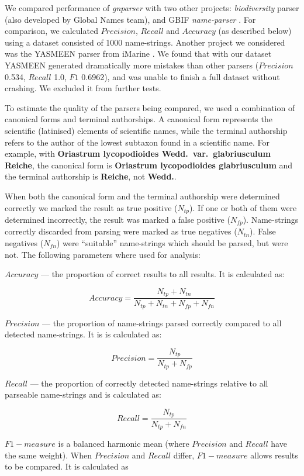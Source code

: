 \documentclass{bmcart}
\begin{document}
We compared performance of \textit{gnparser} with two other projects: \textit{biodiversity} parser \cite{Boyle2013, biodiversity} (also developed by Global Names team), and GBIF \textit{name-parser} \cite{gbifNameParser}. For comparison, we calculated $Precision$, $Recall$ and $Accuracy$ (as described below) using a dataset consisted of 1000 name-strings. Another project we considered was the YASMEEN parser from iMarine \cite{VandenBerghe2015}. We found that with our dataset YASMEEN generated dramatically more mistakes than other parsers ($Precision$ 0.534, $Recall$ 1.0, $F1$ 0.6962), and was unable to finish a full dataset without crashing. We excluded it from further tests.

To estimate the quality of the parsers being compared, we used a combination of canonical forms and terminal authorships. A canonical form represents the scientific (latinised) elements of scientific names, while the terminal authorship refers to the author of the lowest subtaxon found in a scientific name. For example, with \textbf{Oriastrum lycopodioides Wedd.\ var.\ glabriusculum Reiche}, the canonical form is \textbf{Oriastrum lycopodioides glabriusculum} and the terminal authorship is \textbf{Reiche}, not \textbf{Wedd.}.

When both the canonical form and the terminal authorship were determined correctly we marked the result as true positive ($N_{tp}$). If one or both of them were determined incorrectly, the result was marked a false positive ($N_{fp}$). Name-strings correctly discarded from parsing were marked as true negatives ($N_{tn}$). False negatives ($N_{fn}$) were ``suitable'' name-strings which should be parsed, but were not. The following parameters where used for analysis:

$Accuracy$ --- the proportion of correct results to all results. It is calculated as:

\[Accuracy = \dfrac{N_{tp} + N_{tn}}{N_{tp} + N_{tn} + N_{fp} + N_{fn}}\]

$Precision$ --- the proportion of name-strings parsed correctly compared to all detected name-strings. It is is calculated as:

\[Precision = \dfrac{N_{tp}}{N_{tp} + N_{fp}}\]

$Recall$ --- the proportion of correctly detected name-strings relative to all parseable name-strings and is calculated as:

\[Recall = \dfrac{N_{tp}}{N_{tp} + N_{fn}}\]

$F1-measure$ is a balanced harmonic mean (where $Precision$ and $Recall$ have the same weight). When $Precision$ and $Recall$ differ, $F1-measure$ allows results to be compared. It is calculated as
\end{document}
